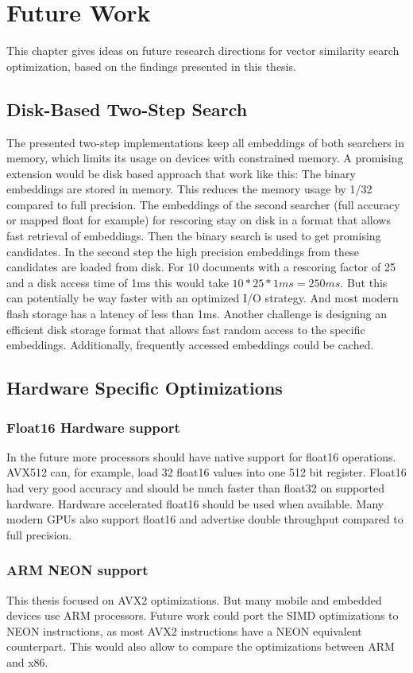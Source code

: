 \chapter{Future Work}
\label{chapter:future_work}
This chapter gives ideas on future research directions for vector similarity search optimization, based on the findings presented in this thesis.

\section{Disk-Based Two-Step Search}
The presented two-step implementations keep all embeddings of both searchers in memory, which limits its usage on devices with constrained memory. A promising extension would be disk based approach that work like this: The binary embeddings are stored in memory. This reduces the memory usage by 1/32 compared to full precision.
The embeddings of the second searcher (full accuracy or mapped float for example) for rescoring stay on disk in a format that allows fast retrieval of embeddings. Then the binary search is used to get promising candidates. In the second step the high precision embeddings from these candidates are loaded from disk. For 10 documents with a rescoring factor of 25 and a disk access time of 1ms this would take $10*25*1ms=250ms$. But this can potentially be way faster with an optimized I/O strategy. And most modern flash storage has a latency of less than 1ms. Another challenge is designing an efficient disk storage format that allows fast random access to the specific embeddings. Additionally, frequently accessed embeddings could be cached.

\section{Hardware Specific Optimizations}
\subsection{Float16 Hardware support}
In the future more processors should have native support for float16 operations. AVX512 can, for example, load 32 float16 values into one 512 bit register. Float16 had very good accuracy and should be much faster than float32 on supported hardware. Hardware accelerated float16 should be used when available. Many modern GPUs also support float16 and advertise double throughput compared to full precision.

\subsection{ARM NEON support}
This thesis focused on AVX2 optimizations. But many mobile and embedded devices use ARM processors. Future work could port the SIMD optimizations to NEON instructions, as most AVX2 instructions have a NEON equivalent counterpart. This would also allow to compare the optimizations between ARM and x86.

